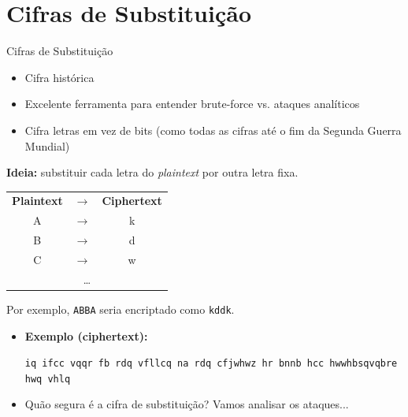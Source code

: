 \documentclass{beamer}
\begin{document}
\section{Cifras de Substituição}
\begin{frame}{Cifras de Substituição}
\begin{itemize}
    \item Cifra histórica
    \item Excelente ferramenta para entender brute-force vs. ataques analíticos
    \item Cifra letras em vez de bits (como todas as cifras até o fim da Segunda Guerra Mundial)
\end{itemize}

\textbf{Ideia:} substituir cada letra do \textit{plaintext} por outra letra fixa.

\begin{center}
\begin{tabular}{c c c}
\textbf{Plaintext} & $\rightarrow$ & \textbf{Ciphertext} \\
A & $\rightarrow$ & k \\
B & $\rightarrow$ & d \\
C & $\rightarrow$ & w \\
\multicolumn{3}{c}{\dots} \\
\end{tabular}
\end{center}

Por exemplo, \texttt{ABBA} seria encriptado como \texttt{kddk}.

\begin{itemize}
    \item \textbf{Exemplo (ciphertext):} \\
    \begin{center}
        \texttt{iq ifcc vqqr fb rdq vfllcq na rdq cfjwhwz hr bnnb hcc hwwhbsqvqbre hwq vhlq}
    \end{center}
    
    \item Quão segura é a cifra de substituição? Vamos analisar os ataques...
\end{itemize}
\end{frame}
\end{document}
